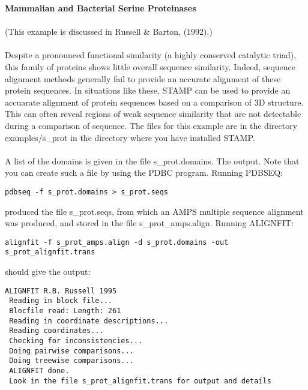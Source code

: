 {\bf Mammalian and Bacterial Serine Proteinases}\\
\\
(This example is discussed in Russell \& Barton, (1992).\nocite{rb92b})\\
\\
Despite a pronounced functional similarity (a highly conserved catalytic 
triad), this family of proteins shows little overall sequence similarity.  
Indeed, sequence alignment methods generally fail to provide an accurate
alignment of these protein sequences.  In situations like these, STAMP 
can be used to provide an accuarate alignment of protein sequences based 
on a comparison of 3D structure.  This can often reveal regions of weak 
sequence similarity that are not detectable during a comparison of 
sequence.  The files for this example are in the directory examples/s\_prot in the 
directory where you have installed STAMP.\\
\\
A list of the domains is given in the file s\_prot.domains. The
output.  Note that you can create such a file by using the PDBC program.  
Running PDBSEQ:\\

\begin{scriptsize}\begin{verbatim}
pdbseq -f s_prot.domains > s_prot.seqs
\end{verbatim} \end{scriptsize}

produced the file s\_prot.seqs, from which an AMPS multiple
sequence alignment was produced, and stored in the file 
s\_prot\_amps.align.  Running ALIGNFIT:\\

\begin{scriptsize}\begin{verbatim}
alignfit -f s_prot_amps.align -d s_prot.domains -out s_prot_alignfit.trans
\end{verbatim} \end{scriptsize}

should give the output:\\

\begin{scriptsize}\begin{verbatim}
ALIGNFIT R.B. Russell 1995
 Reading in block file...
 Blocfile read: Length: 261
 Reading in coordinate descriptions...
 Reading coordinates...
 Checking for inconsistencies...
 Doing pairwise comparisons...
 Doing treewise comparisons...
 ALIGNFIT done.
 Look in the file s_prot_alignfit.trans for output and details
\end{verbatim} \end{scriptsize}

